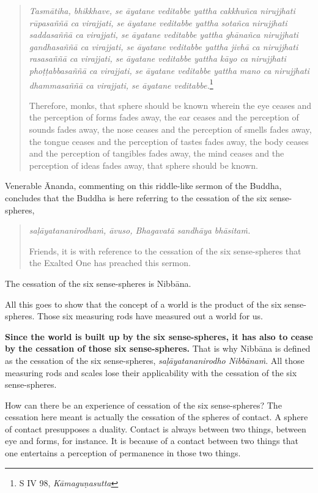 \begin{quote}
\emph{Tasmātiha, bhikkhave, se āyatane veditabbe yattha cakkhuñca nirujjhati rūpasaññā ca virajjati, se āyatane veditabbe yattha sotañca nirujjhati saddasaññā ca virajjati, se āyatane veditabbe yattha ghānañca nirujjhati gandhasaññā ca virajjati, se āyatane veditabbe yattha jivhā ca nirujjhati rasasaññā ca virajjati, se āyatane veditabbe yattha kāyo ca nirujjhati phoṭṭabbasaññā ca virajjati, se āyatane veditabbe yattha mano ca nirujjhati dhammasaññā ca virajjati, se āyatane veditabbe.}\footnote{S IV 98, \emph{Kāmaguṇasutta}}

Therefore, monks, that sphere should be known wherein the eye ceases and the perception of forms fades away, the ear ceases and the perception of sounds fades away, the nose ceases and the perception of smells fades away, the tongue ceases and the perception of tastes fades away, the body ceases and the perception of tangibles fades away, the mind ceases and the perception of ideas fades away, that sphere should be known.
\end{quote}

Venerable Ānanda, commenting on this riddle-like sermon of the Buddha, concludes that the Buddha is here referring to the cessation of the six sense-spheres,

\begin{quote}
\emph{saḷāyatananirodhaṁ, āvuso, Bhagavatā sandhāya bhāsitaṁ.}

Friends, it is with reference to the cessation of the six sense-spheres that the Exalted One has preached this sermon.
\end{quote}

The cessation of the six sense-spheres is Nibbāna.

All this goes to show that the concept of a world is the product of the six sense-spheres. Those six measuring rods have measured out a world for us.

\textbf{Since the world is built up by the six sense-spheres, it has also to cease by the cessation of those six sense-spheres.} That is why Nibbāna is defined as the cessation of the six sense-spheres, \emph{saḷāyatananirodho Nibbānaṁ}. All those measuring rods and scales lose their applicability with the cessation of the six sense-spheres.

How can there be an experience of cessation of the six sense-spheres? The cessation here meant is actually the cessation of the spheres of contact. A sphere of contact presupposes a duality. Contact is always between two things, between eye and forms, for instance. It is because of a contact between two things that one entertains a perception of permanence in those two things.

